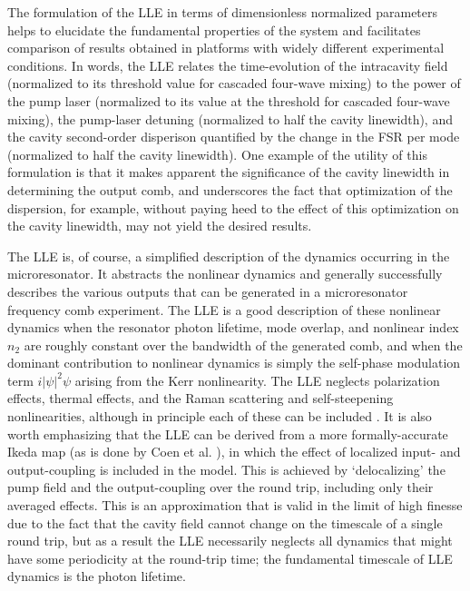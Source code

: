 The formulation of the LLE in terms of dimensionless normalized parameters helps to elucidate the fundamental properties of the system and facilitates comparison of results obtained in platforms with widely different experimental conditions. In words, the LLE relates the time-evolution of the intracavity field (normalized to its threshold value for cascaded four-wave mixing) to the power of the pump laser (normalized to its value at the threshold for cascaded four-wave mixing), the pump-laser detuning (normalized to half the cavity linewidth), and the cavity second-order disperison quantified by the change in the FSR per mode (normalized to half the cavity linewidth). One example of the utility of this formulation is that it makes apparent the significance of the cavity linewidth in determining the output comb, and underscores the fact that optimization of the dispersion, for example, without paying heed to the effect of this optimization on the cavity linewidth, may not yield the desired results.

The LLE is, of course, a simplified description of the dynamics occurring in the microresonator. It abstracts the nonlinear dynamics and generally successfully describes the various outputs that can be generated in a microresonator frequency comb experiment. The LLE is a good description of these nonlinear dynamics when the resonator photon lifetime, mode overlap, and nonlinear index $n_2$ are roughly constant over the bandwidth of the generated comb, and when the dominant contribution to nonlinear dynamics is simply the self-phase modulation term $i|\psi|^2\psi$ arising from the Kerr nonlinearity. The LLE neglects polarization effects, thermal effects, and the Raman scattering and self-steepening nonlinearities, although in principle each of these can be included \cite{Hansson2018,Herr2014wArxiv,Chembo2015,Agrawal2007}. It is also worth emphasizing that the LLE can be derived from a more formally-accurate Ikeda map (as is done by Coen et al. \cite{Coen2013a}), in which the effect of localized input- and output-coupling is included in the model. This is achieved by `delocalizing' the pump field and the output-coupling over the round trip, including only their averaged effects. This is an approximation that is valid in the limit of high finesse due to the fact that the cavity field cannot change on the timescale of a single round trip, but as a result the LLE necessarily neglects all dynamics that might have some periodicity at the round-trip time; the fundamental timescale of LLE dynamics is the photon lifetime. 

